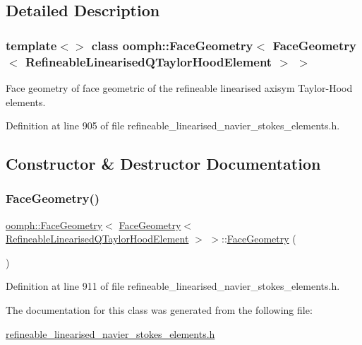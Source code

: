 \subsection{Detailed Description}
\subsubsection*{template$<$$>$\newline
class oomph\+::\+Face\+Geometry$<$ Face\+Geometry$<$ Refineable\+Linearised\+Q\+Taylor\+Hood\+Element $>$ $>$}

Face geometry of face geometric of the refineable linearised axisym Taylor-\/\+Hood elements. 

Definition at line 905 of file refineable\+\_\+linearised\+\_\+navier\+\_\+stokes\+\_\+elements.\+h.



\subsection{Constructor \& Destructor Documentation}
\mbox{\label{classoomph_1_1FaceGeometry_3_01FaceGeometry_3_01RefineableLinearisedQTaylorHoodElement_01_4_01_4_a363c40c076cd574b7876d3acaf96d982}} 
\subsubsection{\texorpdfstring{Face\+Geometry()}{FaceGeometry()}}
{\footnotesize\ttfamily \hyperlink{classoomph_1_1FaceGeometry}{oomph\+::\+Face\+Geometry}$<$ \hyperlink{classoomph_1_1FaceGeometry}{Face\+Geometry}$<$ \hyperlink{classoomph_1_1RefineableLinearisedQTaylorHoodElement}{Refineable\+Linearised\+Q\+Taylor\+Hood\+Element} $>$ $>$\+::\hyperlink{classoomph_1_1FaceGeometry}{Face\+Geometry} (\begin{DoxyParamCaption}{ }\end{DoxyParamCaption})\hspace{0.3cm}{\ttfamily [inline]}}



Definition at line 911 of file refineable\+\_\+linearised\+\_\+navier\+\_\+stokes\+\_\+elements.\+h.



The documentation for this class was generated from the following file\+:\begin{DoxyCompactItemize}
\item 
\hyperlink{refineable__linearised__navier__stokes__elements_8h}{refineable\+\_\+linearised\+\_\+navier\+\_\+stokes\+\_\+elements.\+h}\end{DoxyCompactItemize}
